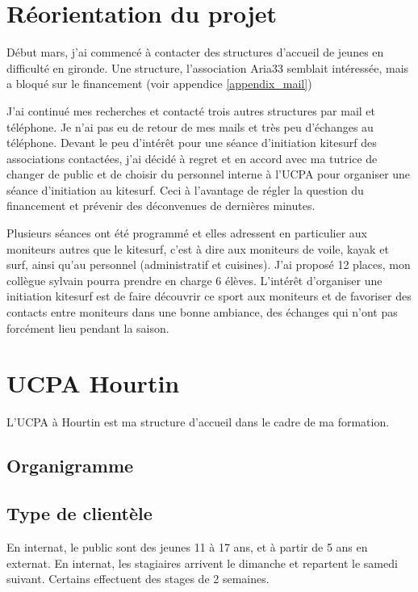 \documentclass[12pt,a4paper]{report}
\begin{document}
\section{Réorientation du projet}

Début mars, j'ai commencé à contacter des structures d'accueil de jeunes 
en difficulté en gironde. Une structure, l'association Aria33 semblait 
intéressée, mais a bloqué sur le financement (voir appendice \ref{appendix_mail})

J'ai continué mes recherches et contacté trois autres structures par mail et
téléphone. Je n'ai pas eu de retour de mes mails et très peu d'échanges 
au téléphone. 
Devant le peu d’intérêt pour une séance d'initiation kitesurf
des associations contactées, j'ai décidé à regret et en accord avec ma tutrice
de changer de public et de choisir du personnel interne à l'UCPA pour organiser
une séance d'initiation au kitesurf. 
Ceci à l'avantage de régler la question du financement et prévenir des
déconvenues de dernières minutes.

Plusieurs séances ont été programmé et elles adressent en particulier
aux moniteurs autres que le kitesurf, c'est à dire aux moniteurs de voile, kayak et surf, 
ainsi qu'au personnel (administratif et cuisines).
J'ai  proposé 12 places, mon collègue sylvain pourra prendre en charge 6 élèves.
L'intér\^et d'organiser une initiation kitesurf est de faire découvrir ce
sport aux moniteurs et  de favoriser des contacts entre moniteurs dans
une bonne ambiance, des échanges qui n'ont pas forcément lieu pendant la saison.

\section{UCPA Hourtin}
L'UCPA à Hourtin est ma structure d'accueil dans le cadre de ma formation.
\subsection{Organigramme}
\subsection{Type de clientèle}
En internat, le public sont des jeunes 11 à 17 ans, et  à partir de 5 ans  en externat.
En internat, les stagiaires arrivent le dimanche et repartent le samedi suivant.
Certains effectuent des stages de 2 semaines.
\end{document}
